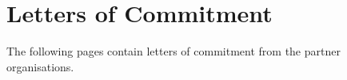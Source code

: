 \section{Letters of Commitment}
\label{sec:letters}

The following pages contain letters of commitment from the partner organisations.

% 
